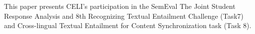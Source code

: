 This paper presents CELI's participation in the SemEval The Joint Student Response Analysis and 8th Recognizing Textual Entailment Challenge (Task7) and
 Cross-lingual Textual Entailment for Content Synchronization task (Task 8).

